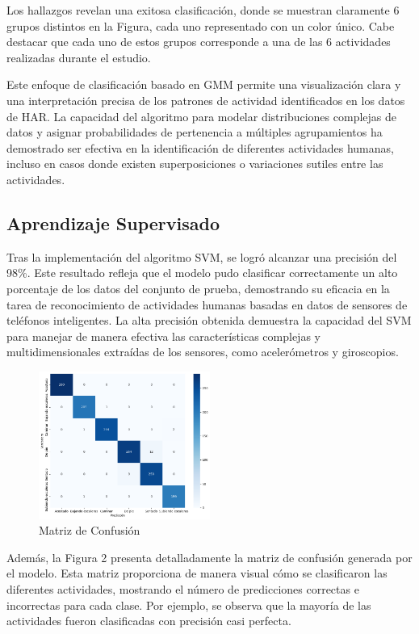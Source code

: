 \documentclass{esannV2}
\begin{document}
Los hallazgos revelan una exitosa clasificación, donde se muestran claramente 6 grupos distintos en la Figura, cada uno representado con un color único. Cabe destacar que cada uno de estos grupos corresponde a una de las 6 actividades realizadas durante el estudio.

Este enfoque de clasificación basado en GMM permite una visualización clara y una interpretación precisa de los patrones de actividad identificados en los datos de HAR. La capacidad del algoritmo para modelar distribuciones complejas de datos y asignar probabilidades de pertenencia a múltiples agrupamientos ha demostrado ser efectiva en la identificación de diferentes actividades humanas, incluso en casos donde existen superposiciones o variaciones sutiles entre las actividades.

\subsection{Aprendizaje Supervisado}
Tras la implementación del algoritmo SVM, se logró alcanzar una precisión del 98\%. Este resultado refleja que el modelo pudo clasificar correctamente un alto porcentaje de los datos del conjunto de prueba, demostrando su eficacia en la tarea de reconocimiento de actividades humanas basadas en datos de sensores de teléfonos inteligentes. La alta precisión obtenida demuestra la capacidad del SVM para manejar de manera efectiva las características complejas y multidimensionales extraídas de los sensores, como acelerómetros y giroscopios.
\begin{figure}[ht!]
\centering
\includegraphics[width=0.5\textwidth]{figs/SVM_matriz.png}
\caption{Matriz de Confusión}\label{Fig:matriz_SVG}
\end{figure}
Además, la Figura 2 presenta detalladamente la matriz de confusión generada por el modelo. Esta matriz proporciona de manera visual cómo se clasificaron las diferentes actividades, mostrando el número de predicciones correctas e incorrectas para cada clase. Por ejemplo, se observa que la mayoría de las actividades fueron clasificadas con precisión casi perfecta.
\end{document}
